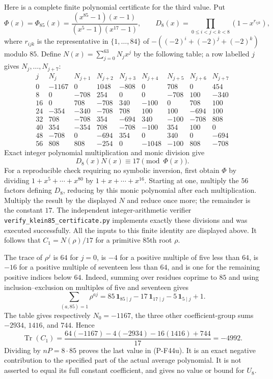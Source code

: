 \documentclass[11pt,a4paper]{article}
\begin{document}
Here is a complete finite polynomial certificate for the
third value. Put
\[
 \Phi(x)=\Phi_{85}(x)
       =\frac{(x^{85}-1)(x-1)}{(x^5-1)(x^{17}-1)},\qquad
 D_8(x)=\prod_{0\le i<j<k<8}(1-x^{r_{ijk}}),
\]
where $r_{ijk}$ is the representative in $\{1,\ldots,84\}$
of $-((-2)^i+(-2)^j+(-2)^k)$ modulo $85$.
Define $N(x)=\sum_{j=0}^{63}N_jx^j$ by the following
table; a row labelled $j$ gives $N_j,\ldots,N_{j+7}$:
\[
\begin{array}{r|rrrrrrrr}
 j&N_j&N_{j+1}&N_{j+2}&N_{j+3}&N_{j+4}&N_{j+5}&N_{j+6}&N_{j+7}\\\hline
 0&-1167&0&1048&-808&0&708&0&454\\
 8&0&-708&254&0&0&-708&100&-340\\
16&0&708&-708&340&-100&0&708&100\\
24&-354&-340&-708&708&100&100&-694&100\\
32&708&-708&354&-694&340&-100&-708&808\\
40&354&-354&708&-708&-100&354&100&0\\
48&-708&0&-694&354&0&340&0&-694\\
56&808&808&-254&0&-1048&-100&808&-708
\end{array}
\]
Exact integer polynomial multiplication and monic division give
\[
                         D_8(x)N(x)\equiv17\pmod{\Phi(x)}.
 \tag{P-F44v}
\]
For a reproducible check requiring no symbolic inversion,
first obtain $\Phi$ by dividing
$1+x^5+\cdots+x^{80}$ by $1+x+\cdots+x^{16}$.
Starting at one, multiply the $56$ factors defining $D_8$,
reducing by this monic polynomial after each multiplication.
Multiply the result by the displayed $N$ and reduce once
more; the remainder is the constant $17$.
The independent integer-arithmetic verifier
\texttt{verify\_klein85\_certificate.py} implements exactly
these divisions and was executed successfully.
All the inputs to this finite identity are displayed above.
It follows that $C_1=N(\rho)/17$ for a primitive
$85$th root $\rho$.

The trace of $\rho^j$ is $64$ for $j=0$, is $-4$ for a
positive multiple of five less than $64$, is $-16$ for
a positive multiple of seventeen less than $64$, and
is one for the remaining positive indices below $64$.
Indeed, summing over residues coprime to $85$ and using
inclusion--exclusion on multiples of five and seventeen
gives
\[
 \sum_{(a,85)=1}\rho^{aj}
   =85\,\mathbf1_{85\mid j}
          -17\,\mathbf1_{17\mid j}
          -5\,\mathbf1_{5\mid j}+1.
\]
The table gives respectively
$N_0=-1167$, the three other coefficient-group sums
$-2934$, $1416$, and $744$. Hence
\[
 \operatorname{Tr}(C_1)
  =\frac{64(-1167)-4(-2934)-16(1416)+744}{17}
  =-4992.
 \tag{P-F44w}
\]
Dividing by $nP=8\cdot85$ proves the last value in
(P-F44u).
It is an exact negative contribution to the specified
part of the actual average polynomial.
It is not asserted to equal its full constant coefficient,
and gives no value or bound for $U_8$.
\end{document}
